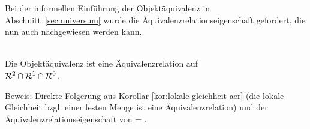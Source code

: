    Bei der informellen Einführung der Objektäquivalenz in Abschnitt~\ref{sec:universum} wurde die Äquivalenzrelationseigenschaft gefordert, die nun auch nachgewiesen werden kann.
    
    \begin{satz}\ \\
        Die Objektäquivalenz ist eine Äquivalenzrelation auf\\
        $\mathcal{R}^2 \cap \mathcal{R}^1 \cap \mathcal{R}^0$.
    \end{satz}
    
    Beweis: Direkte Folgerung aus Korollar \ref{kor:lokale-gleichheit-aer} (die lokale Gleichheit bzgl. einer festen Menge ist eine Äquivalenzrelation) und der Äquivalenzrelationseigenschaft von \glqq = \grqq .
 
 
    
    
    
    
